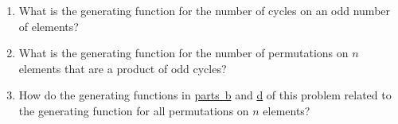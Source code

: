 \documentclass[10pt,]{book}
\theoremstyle{plain}
\theoremstyle{definition}
\theoremstyle{definition}
\numberwithin{equation}{chapter}
\begin{document}
\begin{exerciselist}
\begin{enumerate}[label=(\alph*)]
\item\hypertarget{li-139}{}What is the generating function for the number of cycles on an odd number of elements?%
\item\hypertarget{EGF-perm-odd-cycles}{}What is the generating function for the number of permutations on \(n\) elements that are a product of odd cycles?%
\item\hypertarget{li-141}{}How do the generating functions in \hyperlink{EGF-perm-even-cycles}{parts~b} and \hyperlink{EGF-perm-odd-cycles}{d} of this problem related to the generating function for all permutations on \(n\) elements?%
\end{enumerate}
%
\par\smallskip
\end{exerciselist}
\typeout{************************************************}
\typeout{************************************************}
\end{document}
